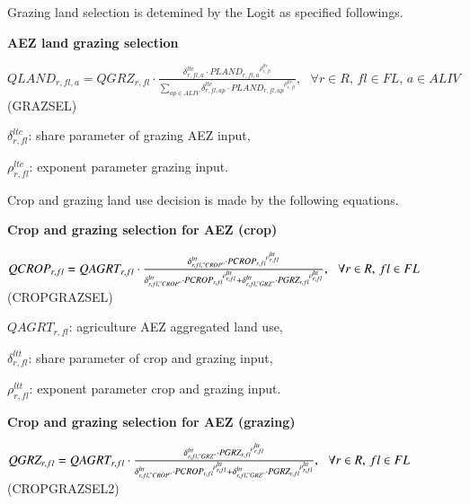 \documentclass[10pt,a4paper,titlepage,dvipdfmx]{book}
\begin{document}
Grazing land selection is detemined by the Logit as specified followings.

\begin{flushleft}\textbf{AEZ land grazing selection}\end{flushleft}


\begin{center}$QLAND_{r,fl,a}=QGRZ_{r,fl}\cdot \frac{\delta _{r,fl,a}^{ltc}\cdot PLAN{D_{r,fl,a}}^{\rho _{r,fl}^{ltc}}}{\sum _{ap\in ALIV}\delta _{r,fl,ap}^{ltc}\cdot PLAN{D_{r,fl,ap}}^{\rho _{r,fl}^{ltc}}},\,\,\,\,\forall r\in R,\,fl\in FL,\,a\in ALIV$ (GRAZSEL)
\end{center}

\begin{flushleft}
$\delta _{r,fl}^{ltc}$: share parameter of grazing AEZ input,

$\rho _{r,fl}^{ltc}$: exponent parameter grazing input.
\end{flushleft}

Crop and grazing land use decision is made by the following equations.

\begin{flushleft}\textbf{Crop and grazing selection for AEZ (crop)}\end{flushleft}


\begin{center}$QCROP_{r,fl}=QAGRT_{r,fl}\cdot \frac{\delta _{r,fl,"CROP"}^{ltt}\cdot PCRO{P_{r,fl}}^{\rho _{r,fl}^{ltt}}}{\delta _{r,fl,"CROP"}^{ltt}\cdot PCRO{P_{r,fl}}^{\rho _{r,fl}^{ltt}}+\delta _{r,fl,"GRZ"}^{ltt}\cdot PGR{Z_{r,fl}}^{\rho _{r,fl}^{ltt}}},\,\,\,\,\forall r\in R,\,fl\in FL$ (CROPGRAZSEL)
\end{center}

\begin{flushleft}
$QAGRT_{r,fl}$: agriculture AEZ aggregated land use,

$\delta _{r,fl}^{ltt}$: share parameter of crop and grazing input,

$\rho _{r,fl}^{ltt}$: exponent parameter crop and grazing input.
\end{flushleft}

\begin{flushleft}\textbf{Crop and grazing selection for AEZ (grazing)}\end{flushleft}


\begin{center}$QGRZ_{r,fl}=QAGRT_{r,fl}\cdot \frac{\delta _{r,fl,"GRZ"}^{ltt}\cdot PGR{Z_{r,fl}}^{\rho _{r,fl}^{ltt}}}{\delta _{r,fl,"CROP"}^{ltt}\cdot PCRO{P_{r,fl}}^{\rho _{r,fl}^{ltt}}+\delta _{r,fl,"GRZ"}^{ltt}\cdot PGR{Z_{r,fl}}^{\rho _{r,fl}^{ltt}}},\,\,\,\,\forall r\in R,\,fl\in FL$ (CROPGRAZSEL2)
\end{center}
\end{document}
